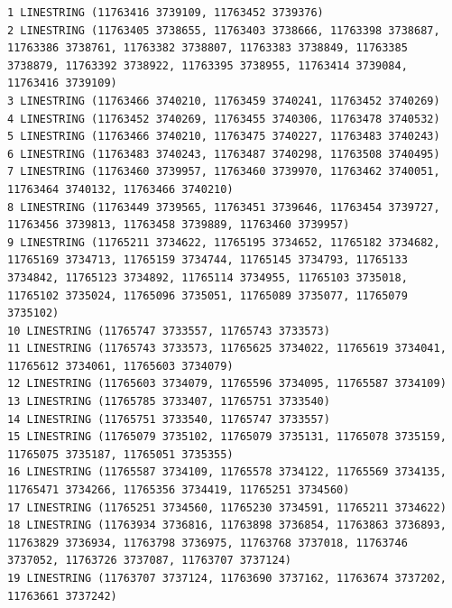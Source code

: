\documentclass[
  letterpaper,
]{book}
\newenvironment{Shaded}{\begin{snugshade}}{\end{snugshade}}
\newcommand{\ControlFlowTok}[1]{\textcolor[rgb]{0.00,0.23,0.31}{\textbf{#1}}}
\newcommand{\DecValTok}[1]{\textcolor[rgb]{0.68,0.00,0.00}{#1}}
\newcommand{\FunctionTok}[1]{\textcolor[rgb]{0.28,0.35,0.67}{#1}}
\newcommand{\NormalTok}[1]{\textcolor[rgb]{0.00,0.23,0.31}{#1}}
\newcommand{\OtherTok}[1]{\textcolor[rgb]{0.00,0.23,0.31}{#1}}
\newcommand{\SpecialCharTok}[1]{\textcolor[rgb]{0.37,0.37,0.37}{#1}}
\newcommand{\StringTok}[1]{\textcolor[rgb]{0.13,0.47,0.30}{#1}}
\begin{document}
\begin{Shaded}
\end{Shaded}

\begin{verbatim}
1 LINESTRING (11763416 3739109, 11763452 3739376) 
2 LINESTRING (11763405 3738655, 11763403 3738666, 11763398 3738687, 11763386 3738761, 11763382 3738807, 11763383 3738849, 11763385 3738879, 11763392 3738922, 11763395 3738955, 11763414 3739084, 11763416 3739109) 
3 LINESTRING (11763466 3740210, 11763459 3740241, 11763452 3740269) 
4 LINESTRING (11763452 3740269, 11763455 3740306, 11763478 3740532) 
5 LINESTRING (11763466 3740210, 11763475 3740227, 11763483 3740243) 
6 LINESTRING (11763483 3740243, 11763487 3740298, 11763508 3740495) 
7 LINESTRING (11763460 3739957, 11763460 3739970, 11763462 3740051, 11763464 3740132, 11763466 3740210) 
8 LINESTRING (11763449 3739565, 11763451 3739646, 11763454 3739727, 11763456 3739813, 11763458 3739889, 11763460 3739957) 
9 LINESTRING (11765211 3734622, 11765195 3734652, 11765182 3734682, 11765169 3734713, 11765159 3734744, 11765145 3734793, 11765133 3734842, 11765123 3734892, 11765114 3734955, 11765103 3735018, 11765102 3735024, 11765096 3735051, 11765089 3735077, 11765079 3735102) 
10 LINESTRING (11765747 3733557, 11765743 3733573) 
11 LINESTRING (11765743 3733573, 11765625 3734022, 11765619 3734041, 11765612 3734061, 11765603 3734079) 
12 LINESTRING (11765603 3734079, 11765596 3734095, 11765587 3734109) 
13 LINESTRING (11765785 3733407, 11765751 3733540) 
14 LINESTRING (11765751 3733540, 11765747 3733557) 
15 LINESTRING (11765079 3735102, 11765079 3735131, 11765078 3735159, 11765075 3735187, 11765051 3735355) 
16 LINESTRING (11765587 3734109, 11765578 3734122, 11765569 3734135, 11765471 3734266, 11765356 3734419, 11765251 3734560) 
17 LINESTRING (11765251 3734560, 11765230 3734591, 11765211 3734622) 
18 LINESTRING (11763934 3736816, 11763898 3736854, 11763863 3736893, 11763829 3736934, 11763798 3736975, 11763768 3737018, 11763746 3737052, 11763726 3737087, 11763707 3737124) 
19 LINESTRING (11763707 3737124, 11763690 3737162, 11763674 3737202, 11763661 3737242) 

\end{verbatim}
\end{document}
